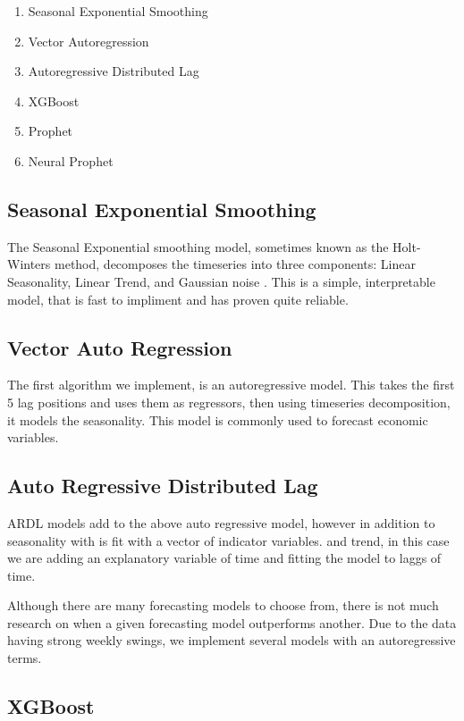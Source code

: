 \documentclass[16pt,twocolumn,letterpaper]{article}
\begin{document}
\begin{enumerate}
\item Seasonal Exponential Smoothing
\item Vector Autoregression
\item Autoregressive Distributed Lag
\item XGBoost 
\item Prophet
\item Neural Prophet
\end{enumerate}

\subsection{Seasonal Exponential Smoothing}

The Seasonal Exponential smoothing model, sometimes known as the Holt-Winters method, decomposes the timeseries into three components: Linear Seasonality, Linear Trend, and Gaussian noise \cite{hyndman2018forecasting}. This is a simple, interpretable model, that is fast to impliment and has proven quite reliable.

\subsection{Vector Auto Regression}

The first algorithm we implement, is an autoregressive model. This takes the first 5 lag positions and uses them as regressors, then using timeseries decomposition, it models the seasonality\cite{hamilton1994}. This model is commonly used to forecast economic variables.

\subsection{Auto Regressive Distributed Lag}

ARDL models add to the above auto regressive model, however in addition to seasonality with is fit with a vector of indicator variables. and trend, in this case we are adding an explanatory variable of time and fitting the model to laggs of time.

Although there are many forecasting models to choose from, there is not much research on when a given forecasting model outperforms another. Due to the data having strong weekly swings, we implement several models with an autoregressive terms.


\subsection{XGBoost}
\end{document}
